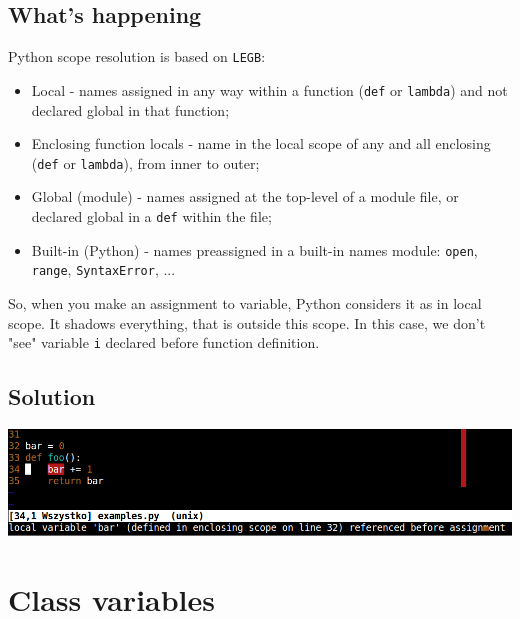 \documentclass{beamer}
\begin{document}
\subsection{What's happening}
\begin{frame}
Python scope resolution is based on \texttt{LEGB}:
\begin{itemize}
\item Local - names assigned in any way within a function (\texttt{def} or \texttt{lambda}) and not declared global in that function;
\item Enclosing function locals - name in the local	scope of any and all enclosing (\texttt{def} or \texttt{lambda}), from inner to outer;
\item Global (module) - names assigned at the top-level of a module file, or declared global in a \texttt{def} within the file;
\item Built-in (Python) - names preassigned in a built-in names module: \texttt{open}, \texttt{range}, \texttt{SyntaxError}, ...
\end{itemize}
So, when you make an assignment to variable, Python considers it as in local scope.
It shadows everything, that is outside this scope. In this case, we don't "see"
variable \texttt{i} declared before function definition.
\end{frame}

\subsection{Solution}
\begin{frame}

\pause 
\pause
\includegraphics[width=1\textwidth]{images/scope.png}
\end{frame}

\section{Class variables}
\end{document}
